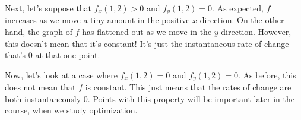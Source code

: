 \documentclass{ximera}
\begin{document}

Next, let's suppose that $f_x(1,2)>0$ and $f_y(1,2) =0$. As expected, $f$ increases as we move a tiny amount in the positive $x$ direction. On the other hand, the graph of $f$ has flattened out as we move in the $y$ direction. However, this doesn't mean that it's constant! It's just the instantaneous rate of change that's $0$ at that one point.


Now, let's look at a case where $f_x(1,2)=0$ and $f_y(1,2)=0$. As before, this does not mean that $f$ is constant. This just means that the rates of change are both instantaneously $0$. Points with this property will be important later in the course, when we study optimization.

\end{document}
